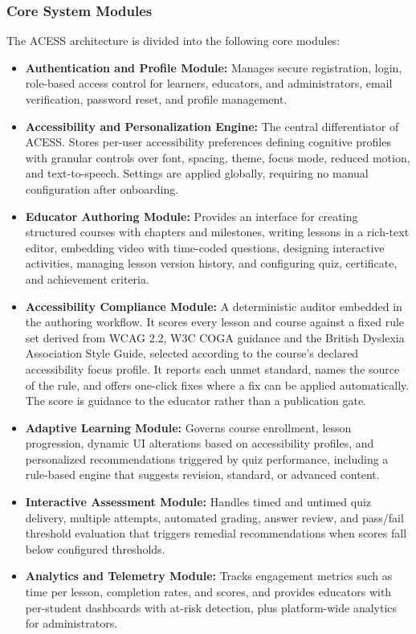\documentclass[12pt, oneside]{article} %
\begin{document}
\subsubsection{Core System Modules}
The ACESS architecture is divided into the following core modules:
\begin{itemize}
    \item \textbf{Authentication and Profile Module:} Manages secure registration, login, role-based access control for learners, educators, and administrators, email verification, password reset, and profile management.
    \item \textbf{Accessibility and Personalization Engine:} The central differentiator of ACESS. Stores per-user accessibility preferences defining cognitive profiles with granular controls over font, spacing, theme, focus mode, reduced motion, and text-to-speech. Settings are applied globally, requiring no manual configuration after onboarding.
    \item \textbf{Educator Authoring Module:} Provides an interface for creating structured courses with chapters and milestones, writing lessons in a rich-text editor, embedding video with time-coded questions, designing interactive activities, managing lesson version history, and configuring quiz, certificate, and achievement criteria.
    \item \textbf{Accessibility Compliance Module:} A deterministic auditor embedded in the authoring workflow. It scores every lesson and course against a fixed rule set derived from WCAG 2.2, W3C COGA guidance and the British Dyslexia Association Style Guide, selected according to the course's declared accessibility focus profile. It reports each unmet standard, names the source of the rule, and offers one-click fixes where a fix can be applied automatically. The score is guidance to the educator rather than a publication gate.
    \item \textbf{Adaptive Learning Module:} Governs course enrollment, lesson progression, dynamic UI alterations based on accessibility profiles, and personalized recommendations triggered by quiz performance, including a rule-based engine that suggests revision, standard, or advanced content.
    \item \textbf{Interactive Assessment Module:} Handles timed and untimed quiz delivery, multiple attempts, automated grading, answer review, and pass/fail threshold evaluation that triggers remedial recommendations when scores fall below configured thresholds.
    \item \textbf{Analytics and Telemetry Module:} Tracks engagement metrics such as time per lesson, completion rates, and scores, and provides educators with per-student dashboards with at-risk detection, plus platform-wide analytics for administrators.

\end{itemize}
\end{document}
